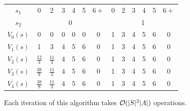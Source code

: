 \documentclass[11pt, a4paper]{article}
\begin{document}
\begin{enumerate}
\begin{solution}
\begin{itemize}
            \begin{table}[h]
                \centering
                \begin{tabular}{c|cccccc|cccccc}
                    \toprule
                    $s_1$    & 0 & 2 & 3 & 4 & 5 & $6+$ & 0 & 2 & 3 & 4 & 5 & $6+$ \\
                    $s_2$    & \multicolumn{6}{c|}{0}   & \multicolumn{6}{c}{1}    \\
                    \midrule
                    $V_0(s)$ & 0 & 0 & 0 & 0 & 0 & 0    & 1 & 3 & 4 & 5 & 6 & 0    \\
                    $V_1(s)$ & 1 & 3 & 4 & 5 & 6 & 0    & 1 & 3 & 4 & 5 & 6 & 0    \\
                    $V_2(s)$ & $\frac{12}{3}$ & $\frac{11}{3}$ & 4 & 5 & 6 & 0 & 1 & 3 & 4 & 5 & 6 & 0 \\
                    $V_3(s)$ & $\frac{38}{9}$ & $\frac{11}{3}$ & 4 & 5 & 6 & 0 & 1 & 3 & 4 & 5 & 6 & 0 \\
                    $V_4(s)$ & $\frac{38}{9}$ & $\frac{11}{3}$ & 4 & 5 & 6 & 0 & 1 & 3 & 4 & 5 & 6 & 0 \\
                    \bottomrule
                \end{tabular}
            \end{table}

            Each iteration of this algorithm takes $\mathcal{O}(\lvert S\rvert^2 \lvert A\rvert)$ operations.


\end{itemize}
\end{solution}
\end{enumerate}
\end{document}

